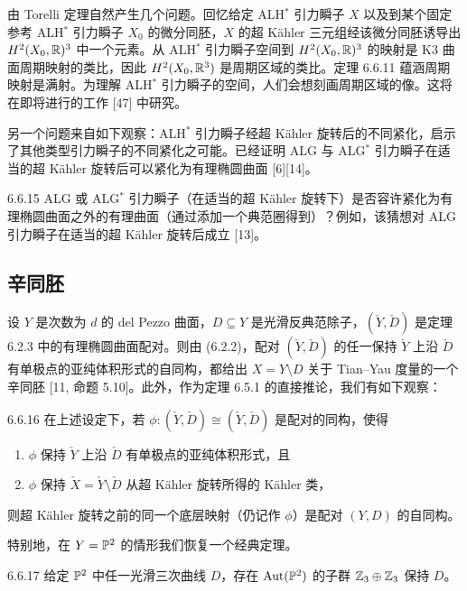 由 Torelli 定理自然产生几个问题。回忆给定 ALH$^*$ 引力瞬子 $X$ 以及到某个固定参考 ALH$^*$ 引力瞬子 $X_0$ 的微分同胚，$X$ 的超 Kähler 三元组经该微分同胚诱导出 $H^2(X_0,\mathbb{R})^3$ 中一个元素。从 ALH$^*$ 引力瞬子空间到 $H^2(X_0,\mathbb{R})^3$ 的映射是 K3 曲面周期映射的类比，因此 $H^2(X_0,\mathbb{R}^3)$ 是周期区域的类比。定理 6.6.11 蕴涵周期映射是满射。为理解 ALH$^*$ 引力瞬子的空间，人们会想刻画周期区域的像。这将在即将进行的工作 [47] 中研究。

另一个问题来自如下观察：ALH$^*$ 引力瞬子经超 Kähler 旋转后的不同紧化，启示了其他类型引力瞬子的不同紧化之可能。已经证明 ALG 与 ALG$^*$ 引力瞬子在适当的超 Kähler 旋转后可以紧化为有理椭圆曲面 [6][14]。

\begin{conjecture}{6.6.15}
ALG 或 ALG$^*$ 引力瞬子（在适当的超 Kähler 旋转下）是否容许紧化为有理椭圆曲面之外的有理曲面（通过添加一个典范圈得到）？例如，该猜想对 ALG 引力瞬子在适当的超 Kähler 旋转后成立 [13]。
\end{conjecture}

\subsection{辛同胚}

设 $Y$ 是次数为 $d$ 的 del Pezzo 曲面，$D\subseteq Y$ 是光滑反典范除子，$(\check Y,\check D)$ 是定理 6.2.3 中的有理椭圆曲面配对。则由 (6.2.2)，配对 $(\check Y,\check D)$ 的任一保持 $\check Y$ 上沿 $\check D$ 有单极点的亚纯体积形式的自同构，都给出 $X=Y\setminus D$ 关于 Tian--Yau 度量的一个辛同胚 [11, 命题 5.10]。此外，作为定理 6.5.1 的直接推论，我们有如下观察：

\begin{proposition}{6.6.16}
在上述设定下，若 $\phi:(\check Y,\check D)\cong(\check Y,\check D)$ 是配对的同构，使得
\begin{enumerate}
\item $\phi$ 保持 $\check Y$ 上沿 $\check D$ 有单极点的亚纯体积形式，且
\item $\phi$ 保持 $\check X=\check Y\setminus\check D$ 从超 Kähler 旋转所得的 Kähler 类，
\end{enumerate}
则超 Kähler 旋转之前的同一个底层映射（仍记作 $\phi$）是配对 $(Y,D)$ 的自同构。
\end{proposition}

特别地，在 $Y=\mathbb{P}^2$ 的情形我们恢复一个经典定理。

\begin{theorem}{6.6.17}
给定 $\mathbb{P}^2$ 中任一光滑三次曲线 $D$，存在 $\operatorname{Aut}(\mathbb{P}^2)$ 的子群 $\mathbb{Z}_3\oplus\mathbb{Z}_3$ 保持 $D$。
\end{theorem}

